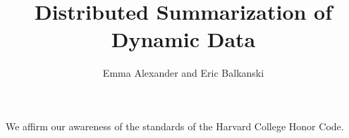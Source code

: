 \documentclass[11pt]{article} %
\title{Distributed Summarization of Dynamic Data}
\author{Emma Alexander and Eric Balkanski}
\begin{document}
\maketitle

We affirm our awareness of the standards of the Harvard College Honor Code.









 
\end{document}
